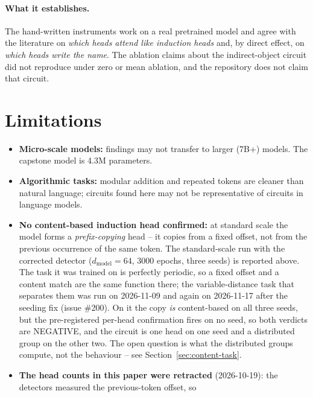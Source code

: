\documentclass[11pt]{article}
\begin{document}
\paragraph{What it establishes.} The hand-written instruments work on a real
pretrained model and agree with the literature on \emph{which heads attend like
induction heads} and, by direct effect, on \emph{which heads write the name}. The
ablation claims about the indirect-object circuit did not reproduce under zero or
mean ablation, and the repository does not claim that circuit.

\section{Limitations}
\label{sec:limitations}

\begin{itemize}
  \item \textbf{Micro-scale models:} findings may not transfer to larger
    (7B+) models. The capstone model is 4.3M parameters.
  \item \textbf{Algorithmic tasks:} modular addition and repeated tokens
    are cleaner than natural language; circuits found here may not be
    representative of circuits in language models.
  \item \textbf{No content-based induction head confirmed:} at standard scale
    the model forms a \emph{prefix-copying} head -- it copies from a fixed
    offset, not from the previous occurrence of the same token. The
    standard-scale run with the corrected detector ($d_\text{model}=64$,
    3000 epochs, three seeds) is reported above. The task it was trained
    on is perfectly periodic, so a fixed offset and a content match are
    the same function there; the variable-distance task that separates them
    was run on 2026-11-09 and again on 2026-11-17 after the seeding fix (issue \#200). On it the copy \emph{is} content-based
    on all three seeds, but the pre-registered per-head confirmation fires on no seed, so both
    verdicts are NEGATIVE, and the circuit is one head on one seed and a distributed group on the
    other two. The open question is what the distributed groups compute, not the
    behaviour -- see Section~\ref{sec:content-task}.
  \item \textbf{The head counts in this paper were retracted}
    (2026-10-19): the detectors measured the previous-token offset, so

\end{itemize}
\end{document}
